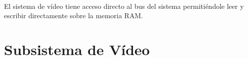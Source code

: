 \documentclass[a4paper,12pt,titlepage,final]{book}
\begin{document}
\paragraph{}
El sistema de vídeo tiene acceso directo al bus del sistema permitiéndole leer y escribir directamente sobre la memoria RAM.

\section{Subsistema de Vídeo}
\subsection*{}
\subsubsection*{}
\end{document}

